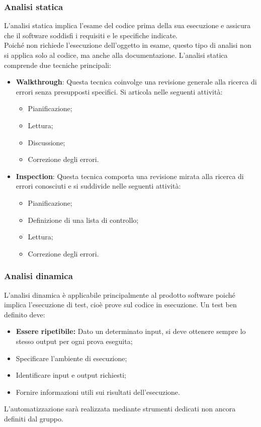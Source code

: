 \subsubsection{Analisi statica}
L'analisi statica implica l'esame del codice prima della sua esecuzione e assicura che il software soddisfi i requisiti
e le specifiche indicate. \\
Poiché non richiede l'esecuzione dell'oggetto in esame, questo tipo di analisi non si applica solo al codice, ma anche alla documentazione.
L'analisi statica comprende due tecniche principali:
\begin{itemize}
    \item \textbf{Walkthrough}: Questa tecnica coinvolge una revisione generale alla ricerca di errori senza presupposti specifici. Si articola nelle seguenti attività:
    \begin{itemize}
        \item Pianificazione;
        \item Lettura;
        \item Discussione;
        \item Correzione degli errori.
    \end{itemize}
    \item \textbf{Inspection}: Questa tecnica comporta una revisione mirata alla ricerca di errori conosciuti e si suddivide nelle seguenti attività:
    \begin{itemize}
        \item Pianificazione;
        \item Definizione di una lista di controllo;
        \item Lettura;
        \item Correzione degli errori.
    \end{itemize}
\end{itemize}
\subsubsection{Analisi dinamica}
L'analisi dinamica è applicabile principalmente al prodotto software
poiché implica l'esecuzione di test, cioè prove sul codice in esecuzione.
Un test ben definito deve:
\begin{itemize}
    \item \textbf{Essere ripetibile:} Dato un determinato input, si deve ottenere sempre lo stesso output per ogni prova eseguita;
    \item Specificare l'ambiente di esecuzione;
    \item Identificare input e output richiesti;
    \item Fornire informazioni utili sui risultati dell'esecuzione.
\end{itemize}
L'automatizzazione sarà realizzata mediante strumenti dedicati non ancora definiti dal gruppo.
